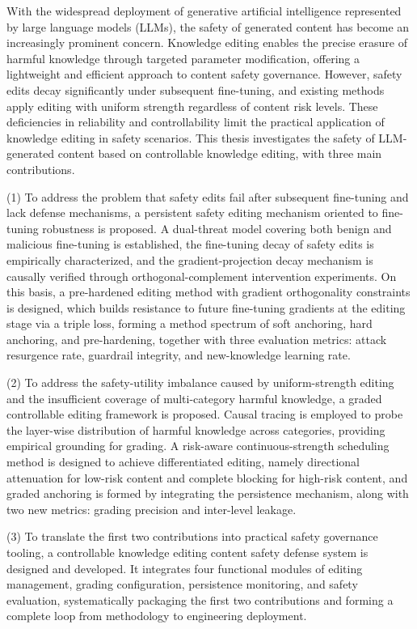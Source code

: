 \begin{eabstract}
With the widespread deployment of generative artificial intelligence represented by large language models (LLMs), the safety of generated content has become an increasingly prominent concern. Knowledge editing enables the precise erasure of harmful knowledge through targeted parameter modification, offering a lightweight and efficient approach to content safety governance. However, safety edits decay significantly under subsequent fine-tuning, and existing methods apply editing with uniform strength regardless of content risk levels. These deficiencies in reliability and controllability limit the practical application of knowledge editing in safety scenarios. This thesis investigates the safety of LLM-generated content based on controllable knowledge editing, with three main contributions.

(1) To address the problem that safety edits fail after subsequent fine-tuning and lack defense mechanisms, a persistent safety editing mechanism oriented to fine-tuning robustness is proposed. A dual-threat model covering both benign and malicious fine-tuning is established, the fine-tuning decay of safety edits is empirically characterized, and the gradient-projection decay mechanism is causally verified through orthogonal-complement intervention experiments. On this basis, a pre-hardened editing method with gradient orthogonality constraints is designed, which builds resistance to future fine-tuning gradients at the editing stage via a triple loss, forming a method spectrum of soft anchoring, hard anchoring, and pre-hardening, together with three evaluation metrics: attack resurgence rate, guardrail integrity, and new-knowledge learning rate.

(2) To address the safety-utility imbalance caused by uniform-strength editing and the insufficient coverage of multi-category harmful knowledge, a graded controllable editing framework is proposed. Causal tracing is employed to probe the layer-wise distribution of harmful knowledge across categories, providing empirical grounding for grading. A risk-aware continuous-strength scheduling method is designed to achieve differentiated editing, namely directional attenuation for low-risk content and complete blocking for high-risk content, and graded anchoring is formed by integrating the persistence mechanism, along with two new metrics: grading precision and inter-level leakage.

(3) To translate the first two contributions into practical safety governance tooling, a controllable knowledge editing content safety defense system is designed and developed. It integrates four functional modules of editing management, grading configuration, persistence monitoring, and safety evaluation, systematically packaging the first two contributions and forming a complete loop from methodology to engineering deployment.


\end{eabstract}
